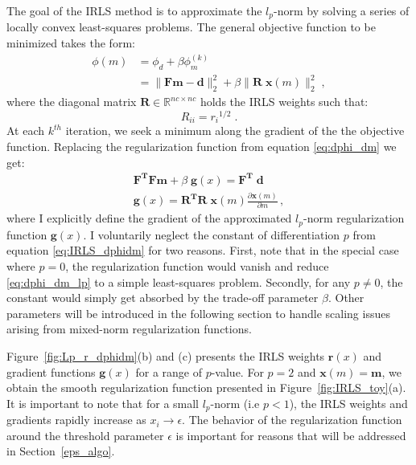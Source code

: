 The goal of the IRLS method  is to approximate the $l_p$-norm by solving a series of locally convex least-squares problems.
The general objective function to be minimized takes the form:
\begin{equation}\label{eq:Lp_phi}
\begin{split}
\phi(m) &= \phi_d + \beta \phi_m^{(k)} \\
 &= \|\mathbf{ Fm - d }\|_2^{2} + \beta  \|\mathbf{ R\;x}(m) \|_2^{2} \;,
 \end{split}
\end{equation}
where the diagonal matrix $\mathbf{R} \in \mathbb{R}^{nc \times nc}$ holds the IRLS weights such that:
\begin{equation}
{R}_{ii} =  {{r}_i }^{1/2} \;.
\end{equation}
At each $k^{th}$ iteration, we seek a minimum along the gradient of the the objective function.
Replacing the regularization function from equation \ref{eq:dphi_dm} we get:
\begin{equation}\label{eq:dphi_dm_lp}
\begin{split}
 \mathbf{F^TF}\mathbf{m} + \beta\;\mathbf{g}(x) = \mathbf{F^T \; d} \\
\mathbf{g}(x) = \mathbf{R^TR\;x}(m) \frac{\partial \mathbf{x}(m)}{\partial m}\, ,
 \end{split}
\end{equation}
where I explicitly define the gradient of the approximated $l_p$-norm regularization function $\mathbf{g}(x)$.
I voluntarily neglect the constant of differentiation $p$ from equation \eqref{eq:IRLS_dphidm} for two reasons.
First, note that in the special case where $p=0$, the regularization function would vanish and reduce \ref{eq:dphi_dm_lp} to a simple least-squares problem.
Secondly, for any $p\ne0$, the constant would simply get absorbed by the trade-off parameter $\beta$.
Other parameters will be introduced in the following section to handle scaling issues arising from mixed-norm regularization functions.

Figure~\ref{fig:Lp_r_dphidm}(b) and (c) presents the IRLS weights $\mathbf{r}(x)$ and gradient functions $\mathbf{g}(x)$ for a range of $p$-value.
For $p=2$ and $\mathbf{x}(m) = \mathbf{m}$, we obtain the smooth regularization function presented in Figure~\ref{fig:IRLS_toy}(a).
It is important to note that for a small $l_p$-norm (i.e $p < 1$), the IRLS weights and gradients rapidly increase as $x_i \rightarrow \epsilon$.
The behavior of the regularization function around the threshold parameter $\epsilon$ is important for reasons that will be addressed in Section~\ref{eps_algo}.  

